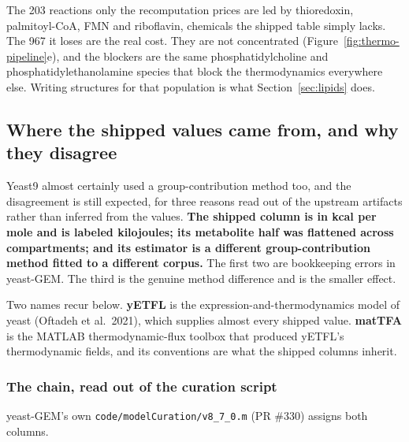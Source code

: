 The 203 reactions only the recomputation prices are led by thioredoxin, palmitoyl-CoA, FMN
and riboflavin, chemicals the shipped table simply lacks. The 967 it loses are the real
cost. They are not concentrated (Figure~\ref{fig:thermo-pipeline}e), and the blockers are the same
phosphatidylcholine and phosphatidylethanolamine species that block the thermodynamics
everywhere else.
Writing structures for that population is what Section~\ref{sec:lipids} does.

\subsection{Where the shipped values came from, and why they disagree}
\label{sec:shipped-provenance}

Yeast9 almost certainly used a group-contribution method too, and the disagreement is still
expected, for three reasons read out of the upstream artifacts rather than inferred from the
values. \textbf{The shipped column is in kcal per mole and is labeled kilojoules; its
metabolite half was flattened across compartments; and its estimator is a different
group-contribution method fitted to a different corpus.} The first two are bookkeeping
errors in yeast-GEM. The third is the genuine method difference and is the smaller
effect.

Two names recur below. \textbf{yETFL} is the expression-and-thermodynamics model of yeast
(Oftadeh et al.\ 2021), which supplies almost every shipped value. \textbf{matTFA} is the
MATLAB thermodynamic-flux toolbox that produced yETFL's thermodynamic fields, and its
conventions are what the shipped columns inherit.

\subsubsection*{The chain, read out of the curation script}

yeast-GEM's own \texttt{code/modelCuration/v8\_7\_0.m} (PR \#330) assigns both columns.


